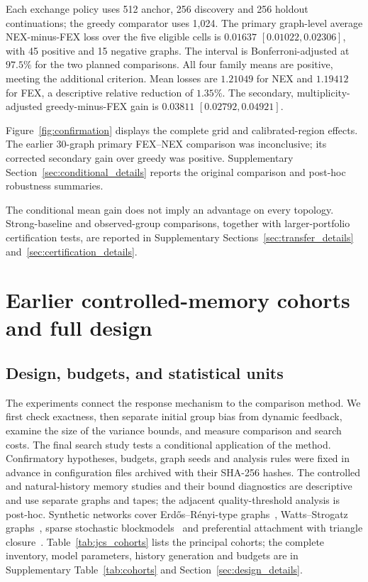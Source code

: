 \documentclass[preprint,11pt,sort&compress]{elsarticle}
\begin{document}
Each exchange policy uses 512 anchor, 256 discovery and 256 holdout continuations; the greedy comparator uses 1,024. The primary graph-level average NEX-minus-FEX loss over the five eligible cells is $0.01637$ $[0.01022,0.02306]$, with 45 positive and 15 negative graphs. The interval is Bonferroni-adjusted at $97.5\%$ for the two planned comparisons. All four family means are positive, meeting the additional criterion. Mean losses are $1.21049$ for NEX and $1.19412$ for FEX, a descriptive relative reduction of $1.35\%$. The secondary, multiplicity-adjusted greedy-minus-FEX gain is $0.03811$ $[0.02792,0.04921]$.

Figure~\ref{fig:confirmation} displays the complete grid and calibrated-region effects. The earlier 30-graph primary FEX--NEX comparison was inconclusive; its corrected secondary gain over greedy was positive. Supplementary Section~\ref{sec:conditional_details} reports the original comparison and post-hoc robustness summaries.

The conditional mean gain does not imply an advantage on every topology. Strong-baseline and observed-group comparisons, together with larger-portfolio certification tests, are reported in Supplementary Sections~\ref{sec:transfer_details} and~\ref{sec:certification_details}.

\section{Earlier controlled-memory cohorts and full design}\label{sec:earlier_memory_cohorts}
\subsection{Design, budgets, and statistical units}
The experiments connect the response mechanism to the comparison method. We first check exactness, then separate initial group bias from dynamic feedback, examine the size of the variance bounds, and measure comparison and search costs. The final search study tests a conditional application of the method. Confirmatory hypotheses, budgets, graph seeds and analysis rules were fixed in advance in configuration files archived with their SHA-256 hashes. The controlled and natural-history memory studies and their bound diagnostics are descriptive and use separate graphs and tapes; the adjacent quality-threshold analysis is post-hoc. Synthetic networks cover Erd\H{o}s--R\'enyi-type graphs~\cite{gilbert1959}, Watts--Strogatz graphs~\cite{watts1998}, sparse stochastic blockmodels~\cite{holland1983} and preferential attachment with triangle closure~\cite{barabasi1999}. Table~\ref{tab:jcs_cohorts} lists the principal cohorts; the complete inventory, model parameters, history generation and budgets are in Supplementary Table~\ref{tab:cohorts} and Section~\ref{sec:design_details}.
\end{document}
